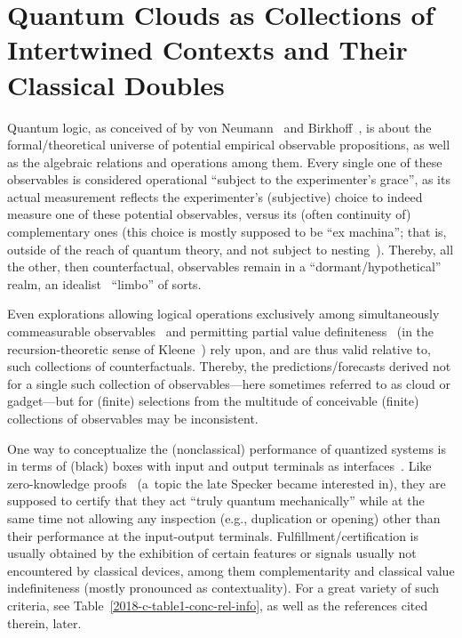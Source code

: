 



\section{Quantum Clouds as Collections of Intertwined Contexts and Their Classical Doubles}

Quantum logic, as conceived of by von Neumann~\cite{v-neumann-49,v-neumann-55} and Birkhoff~\cite{birkhoff-36},
is about the formal/theoretical universe of potential empirical observable propositions,
as well as the algebraic relations and operations among them.
Every single one of these observables is considered operational ``subject to the experimenter's grace'',
as its actual measurement reflects the experimenter's (subjective) choice to indeed measure one of these
potential observables, {versus} its (often continuity of) complementary ones
(this choice is mostly supposed to be {``ex machina''}; that is, outside of the reach of quantum theory,
and not subject to nesting~\cite{everett,wigner:mb,everett-1956}).
Thereby, all the other, then counterfactual, observables remain in a ``dormant/hypothetical'' realm,
an idealist~\cite{berkeley,stace} ``limbo'' of sorts.

Even explorations allowing logical operations exclusively among simultaneously commeasurable observables~\cite{Kochen2,Kochen3}
and permitting partial value definiteness~\cite{2012-incomput-proofsCJ,2015-AnalyticKS}
(in the recursion-theoretic sense of Kleene~\cite{Kleene1936})
rely upon, and are thus valid relative to, such collections of counterfactuals.
Thereby, the predictions/forecasts
derived not for a single such collection of observables---here sometimes referred to as cloud or gadget---but for (finite) selections from the multitude of conceivable (finite) collections of observables
may be inconsistent.


One way to conceptualize the (nonclassical) performance of quantized systems is in terms of (black) boxes
with input and output terminals as interfaces~\cite{2018-minimalYIYS}.
Like zero-knowledge proofs~\cite{Quisquater1990} (a~topic the late Specker became interested in),
they are supposed to certify that they act ``truly quantum mechanically''
while at the same time not allowing any inspection (e.g., duplication or opening)
other than their performance at the input-output
terminals.
Fulfillment/certification is usually obtained by the exhibition of certain features or signals usually not encountered by classical devices, among them complementarity
and classical value indefiniteness (mostly pronounced as contextuality).
For a great variety of such criteria, see Table~\ref{2018-c-table1-conc-rel-info},
as well as the references cited therein, later.

